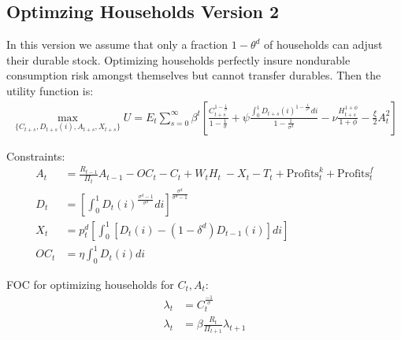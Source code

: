 \documentclass[11pt]{article}
\begin{document}
\subsection{Optimzing Households Version 2}

In this version we assume that only a fraction $1-\theta^d$ of households can adjust their durable stock.
Optimizing households perfectly insure nondurable consumption risk amongst themselves but cannot transfer durables. 
Then the utility function is:
\begin{align*}
	\max_{\{C_{t+s},D_{t+s}(i),A_{t+s},X_{t+s}\}}U = E_t \sum_{s=0}^{\infty}\beta^t \left[\frac{C_{t+s}^{1-\frac{1}{\sigma}}}{1-\frac{1}{\sigma}} + \psi \frac{\int_0^1 D_{t+s}(i)^{1-\frac{1}{\sigma^d}}di}{1-\frac{1}{\sigma^d}}  - \nu \frac{H_{t+s}^{1+\phi}}{1+\phi} - \frac{\xi}{2}A_t^2\right]
\end{align*}

Constraints:
\begin{align*}
	A_t &= \frac{R_{t-1}}{\Pi_t}A_{t-1} - OC_t  - C_t + W_t H_t\ - X_t  - T_t + \text{Profits}_t^k + \text{Profits}_t^f \\
	D_t &= \left[\int_0^{1} D_t(i)^{\frac{\sigma^d-1}{\sigma^d}}di\right]^{\frac{\sigma^d}{\sigma^d-1}} \\
	X_t &= p_t^d \left[\int_0^{1}[D_t(i) - (1-\delta^d)D_{t-1}(i) ]di\right] \\
	OC_t &= \eta  \int_0^{1} D_t(i) di 
\end{align*}


FOC for optimizing households for $C_t, A_t$:
\begin{align*}
	\lambda_t &= C_t^{\frac{-1}{\sigma}} \\
	\lambda_t &= \beta \frac{R_t}{\Pi_{t+1}} \lambda_{t+1}  
\end{align*}
\end{document}
